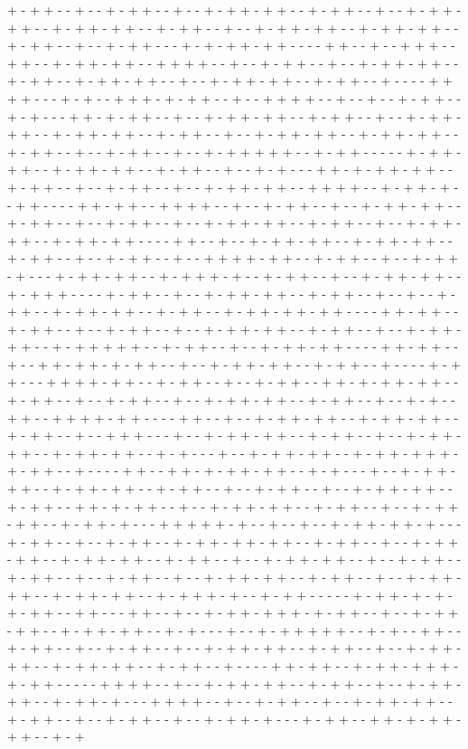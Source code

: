 + - + + - - + - - + - + + - - + - - + - + + - + + - - + - + + - - + - - + - + + - + + - - + - + + - + + - - + - + + - - + - - + - + + - + + - - + - + + - + + - - + - + + - - + - - + - + + - - - + - + - + + - + + - - - - + + - - + - - + + + - - + + - - + - + + - + + - - + + + + - - + - - + - + + - - + - - + - + + - + + - - + - + + - - + - + + - + + - - + - - + - + + - + + - - + - + + - - + - - - - + + + + - - - + - + - - + + + - + - + + - - + - - + + + + - - + - - + - - + - + + - - + - + - - - + + - + - + + - - + - - + - + + - + + - - + - + + - - + - - + - + + - + + - - + - + + - + + - - + - + + - - + - - + - + + - + + - - + - + + - + + - - + - + + - - + - - + - + + - - + - - + - + + + + + - - + - + + - - - - - + - + + - + + - - + - + + - + + - - + - + + - - + - - + - + - - - + + - + - + + - + + - - + - + + - - + - - + - + + - - + - - + - + + - + + - - + + + + - - + - + + - + - - + + - - - - + + - + + - - + + + + - - + - - + - + + - - + - - + - + + - + + - - + - + + - - + - - + - + + - - + - - + - + + - + + - - + - + + - - + - - + - + + - + + - - + - + + - + + - - - - + + - - + - - + - + + - + + - - + - + + - + + - - + - + + - - + - - + - + + - - + - - + + + + - + + - - + - + + - - + - - + - + + - + - - - + - + + - + + - - + - + + + - + - - + - + + - - + - - + - + + - + + - - + - + + + - - - - + - + + - - + - - + - + + - + + - - + - + + - - + - - + - - + - + + - - + - + + - + + - - + - + + - - + - + + - + + - + + - - - - + + - + + - - + - + + - - + - - + - + + - - + - - + - + + - + + - - + - + + - - + - - + - + + - + + - - + - + + + + + - - + - + + - - + - - + - + + - + + - - - - + + - + + - - + - - + + - + + - + - + + - - + - - + - + + - + + - - + - + + - - + - - - - + - + + - - - + + + + - + + - - + - + + - - + - - + - + + - - + + - + - + + - + + - - + - + + - - + - - + - + + - - + - - + - + + - + + - - + - + + - - + - - + - + - - + + - - + + + + - + + - - - - + + - - + - - + - + + - + + - - + - + + - + + - - + - + + - - + - - + + + - - - + - - + - + + - + + - - + - + + - - + - - + - + + - + + - - + - + + - + + - - + - + - - - + - - + - + + - + + - - + - + + - + + + - + - + + - - + - - - - + + - - + + - + - + + - + + - - + - + - - - + - - + - + + - + + - - + - + + - + + - - + - + + - - + - - + - + + - - + - - + - + + - + + - - + - + + - - + + - + - + + - - + - - + - + + - + + - - + - + + - - + - - + - + + - + + - - + - + + - + - - - + + + + + - + - - + - - + - - + - + + - + + - + - - - + - + + - - + - - + - + + - - + - + + - + + - + + - - + - + + - - + - - + - + + - + + - - + - + + - + + - - + - + + - - + - - + - + + - + + - - + - - + - + + - - + - + + - - + - - + - + + - - + - - + - + + - + + - - + - + + - - + - - + - + + - + + - - + - + + - + + - - + - + + + - + - - + - + + - - - - - + - + + - + - + - + - + + - - + + - - - + + - - + - - + - + + - + + + - + - + + - - + - - + - + + - + + - - + - + + - + + - - + - + - - - + - - + - + + + + + - - + - + - - + + - - + - + + - - + - - + - + + - - + - - + - + + - + + - - + - + + - - + - - + - + + - + + - - + - + + - + + - - + - + + - - + - - - - + + - + + - - + - + + - + + + - + - + + - - - - - + + + + - - + - - + - + + - + + - - + - + + - - + - - + - + + - + + - - + - + + - + - - - + + + + - - + - - + - + + - - + - - + - + + - + + - - + - + + - - + - - + - + + - - + - - + - + + - + - - - + - + + - - + + - + - + + - + + - - + - + 